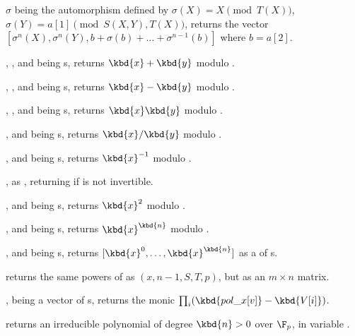 $\sigma$ being the automorphism defined by $\sigma(X)=X\pmod{T(X)}$,
$\sigma(Y)=a[1]\pmod{S(X,Y),T(X)}$, returns the vector
$[\sigma^n(X),\sigma^n(Y),b+\sigma(b)+\ldots+\sigma^{n-1}(b)]$
where $b=a[2]$.


, ,  and
 being s, returns $\kbd{x} + \kbd{y}$ modulo .

, ,  and
 being s, returns $\kbd{x} - \kbd{y}$ modulo .

, ,  and
 being s, returns $\kbd{x}\*\kbd{y}$ modulo .

,  and
 being s, returns $\kbd{x}/\kbd{y}$ modulo .

,  and
 being s, returns $\kbd{x}^{-1}$ modulo .

 , as ,
returning  if  is not invertible.

,  and
 being s, returns $\kbd{x}^2$ modulo .

,  and
 being s, returns $\kbd{x}^\kbd{n}$ modulo .

,  and
 being s, returns $[\kbd{x}^0, \dots, \kbd{x}^\kbd{n}]$ as a
 of s.

returns the same powers of  as $(x, n-1,S, T, p)$,
but as an $m\times n$ matrix.

,
 being a vector of s, returns the monic 
$\prod_i (\kbd{pol\_x[v]} - \kbd{V[i]})$.


 returns an irreducible polynomial
of degree $\kbd{n} > 0$ over $\F_p$, in variable .

